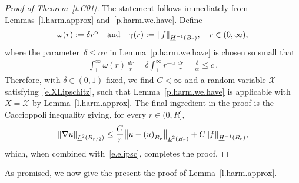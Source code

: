 \documentclass[11pt]{article} %
\numberwithin{equation}{section}
\theoremstyle{definition}
\let\originalleft\left
\let\originalright\right
\renewcommand{\left}{\mathopen{}\mathclose\bgroup\originalleft}
\renewcommand{\right}{\aftergroup\egroup\originalright}
\newcommand{\X}{\mathcal{X}}
\begin{document}
\begin{proof}[Proof of Theorem~\ref{t.C01}]
The statement follows immediately from Lemmas~\ref{l.harm.approx} and~\ref{p.harm.we.have}. Define
\begin{align*}  
\omega(r) := \delta r ^{\alpha}  
\quad 
\mbox{and}
\quad
\gamma(r) := \left\|  f  \right\|_{\underline{H}^{-1}(B_r)},
\quad r\in (0,\infty),
\end{align*}
where the parameter~$\delta \leq \alpha c$ in Lemma~\ref{p.harm.we.have} is chosen so small that 
\begin{align*}  
\int_{1}^\infty \omega (r) \, \frac{dr}{r}  = \delta \int_{1}^\infty r^{-\alpha} \, \frac{dr}{r} = \frac{\delta}{\alpha} \leq c \,.
\end{align*}
Therefore, with $\delta\in (0,1)$ fixed, we find $C<\infty$ and a random variable $\X$ satisfying~\eqref{e.XLipschitz}, such that  Lemma~\ref{p.harm.we.have} is applicable with $X = \X$ by Lemma~\ref{l.harm.approx}. The final ingredient in the proof is the Caccioppoli inequality giving, for every $r \in (0,R]$, 
\begin{equation*} \label{}
\left\| \nabla u \right\|_{\underline{L}^2(B_{r/2})}
\leq 
\frac C{r} \left\| u - \left( u \right)_{B_{r}} \right\|_{\underline{L}^2(B_{r})} + C  \left\| f \right\|_{\underline{H}^{-1}(B_{r})},
\end{equation*}
which, when combined with~\eqref{e.elipsc}, completes the proof.
\end{proof}

As promised, we now give the present the proof of Lemma~\ref{l.harm.approx}.
\end{document}
